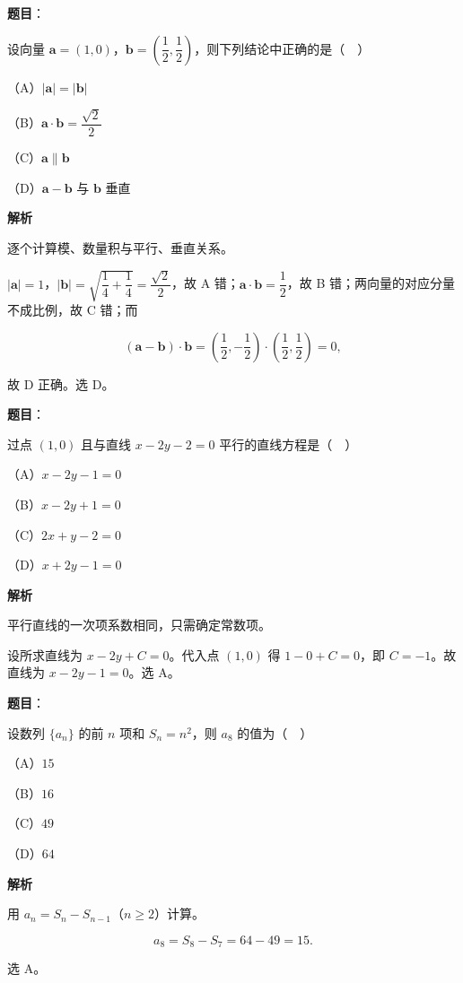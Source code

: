 \begin{answer}

\textbf{题目}：

设向量 $\boldsymbol a=(1,0)$，$\boldsymbol b=\left(\dfrac12,\dfrac12\right)$，则下列结论中正确的是（　）

（A）$|\boldsymbol a|=|\boldsymbol b|$

（B）$\boldsymbol a\cdot\boldsymbol b=\dfrac{\sqrt2}2$

（C）$\boldsymbol a\parallel\boldsymbol b$

（D）$\boldsymbol a-\boldsymbol b$ 与 $\boldsymbol b$ 垂直

\textbf{解析}

逐个计算模、数量积与平行、垂直关系。

$|\boldsymbol a|=1$，$|\boldsymbol b|=\sqrt{\dfrac14+\dfrac14}=\dfrac{\sqrt2}2$，故 A 错；$\boldsymbol a\cdot\boldsymbol b=\dfrac12$，故 B 错；两向量的对应分量不成比例，故 C 错；而

\nopagebreak[4]
\[(\boldsymbol a-\boldsymbol b)\cdot\boldsymbol b
=\left(\frac12,-\frac12\right)\cdot\left(\frac12,\frac12\right)=0,\]

故 D 正确。选 D。


\end{answer}
\begin{answer}

\textbf{题目}：

过点 $(1,0)$ 且与直线 $x-2y-2=0$ 平行的直线方程是（　）

（A）$x-2y-1=0$

（B）$x-2y+1=0$

（C）$2x+y-2=0$

（D）$x+2y-1=0$

\textbf{解析}

平行直线的一次项系数相同，只需确定常数项。

设所求直线为 $x-2y+C=0$。代入点 $(1,0)$ 得 $1-0+C=0$，即 $C=-1$。故直线为 $x-2y-1=0$。选 A。


\end{answer}
\begin{answer}

\textbf{题目}：

设数列 $\{a_n\}$ 的前 $n$ 项和 $S_n=n^2$，则 $a_8$ 的值为（　）

（A）$15$

（B）$16$

（C）$49$

（D）$64$

\textbf{解析}

用 $a_n=S_n-S_{n-1}$（$n\geqslant2$）计算。

\nopagebreak[4]
\[a_8=S_8-S_7=64-49=15.\]

选 A。


\end{answer}
